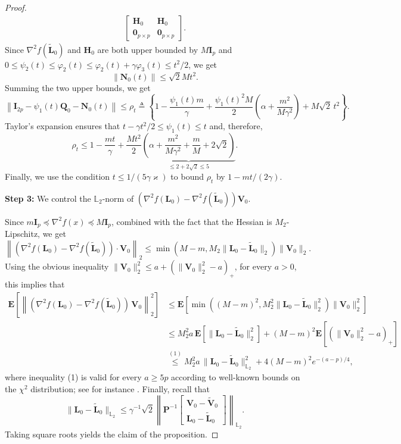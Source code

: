 \documentclass[a4paper,bej,preprint,reqno]{imsart}
\newcommand\bfE{\mathbf E}
\newcommand\bfP{\mathbf P}
\newcommand\bfQ{\mathbf Q}
\newcommand\bfN{\mathbf N}
\newcommand\bfH{\mathbf H}
\newcommand\bL{\boldsymbol L}
\newcommand\bV{\boldsymbol V}
\newcommand\LL{\mathbb L}
\newcommand\bfI{\mathbf I}
\def\Tilde{\widetilde}
\begin{document}
\begin{proof}
\begin{align}
\begin{bmatrix}
     \bfH_0 & \bfH_0 \\
      \mathbf 0_{p\times p} &  \mathbf 0_{p\times p}
\end{bmatrix}.
\end{align}
Since $\nabla^2f(\Tilde{\bL}_0)$ and $\bfH_0$ are both upper bounded by $M\bfI_p$
and $0\le \psi_2(t)\le\varphi_2(t)\le\varphi_2(t)+\gamma\varphi_3(t)\le t^2/2$, we get
$$
\left\|\bfN_0(t)\right\|\le \sqrt{2}M t^2.
$$
Summing the two upper bounds, we get
$$
\left\|\bfI_{2p}-\psi_1(t)\bfQ_0-\bfN_0(t)\right\|\le\rho_t
\triangleq\left\{1-\frac{\psi_1(t)m}{\gamma}+\frac{\psi_1(t)^2M}{2}
\left(\alpha+\frac{m^2}{M\gamma^2}\right)+
M\sqrt2\, t^2\right\}.$$
Taylor's expansion ensures that $t-\gamma t^2/2\le\psi_1(t)\le t$ and, therefore,
$$
\rho_t\le1-\frac{mt}{\gamma}+\frac{Mt^2}{2}\underbrace{\left(\alpha+\frac{m^2}{M\gamma^2}+\frac{m}{M}+2\sqrt{2}\right)}_{\le 2+2\sqrt{2}\le5}.
$$
Finally, we use the condition $t\le 1/(5\gamma\varkappa)$
to bound $\rho_t$ by $1-mt/(2\gamma)$.

\textbf{Step 3:} We control the ${\LL}_2$-norm of $(\nabla^2 f(\bL_0)-\nabla^2 f(\Tilde{\bL}_0))\bV_0$.

Since $m\bfI_p\preccurlyeq\nabla^2 f(x)\preccurlyeq M\bfI_p$, combined with the fact that the Hessian is $M_2$-Lipschitz, we get
$$
\left\|\left(\nabla^2 f(\bL_0)-\nabla^2 f(\Tilde{\bL}_0)\right)\cdot\bV_0\right\|_2\le \min\left(M-m,M_2\|\bL_0-\Tilde{\bL}_0\|_2\right)\|\bV_0\|_2.
$$
Using the obvious inequality $\|\bV_0\|_2^2\le a + (\|\bV_0\|_2^2-a)_+$, for every $a>0$, 
this implies that
\begin{align}
    \bfE\left[\left\|\left(\nabla^2 f(\bL_0)-\nabla^2 f(\Tilde{\bL}_0)\right)
		\,\bV_0\right\|_2^2\right]
				&\le \bfE\left[\min\left((M-m)^2,M_2^2\|\bL_0-\Tilde{\bL}_0\|^2_2\right)
						\|\bV_0\|_2^2\right]\\
				&\le M_2^2a\,\bfE\left[\|\bL_0-\Tilde{\bL}_0\|^2_2\right]
						+(M-m)^2\bfE\left[(\|\bV_0\|_2^2-a)_+\right]\\
				&\stackrel{(1)}{\le} M_2^2a\,\|\bL_0-\Tilde{\bL}_0\|^2_{\LL_2}
						+ 4(M-m)^2e^{-(a-p)/4}, 
\end{align}
where inequality (1) is valid for every $a\ge 5p$ according to well-known bounds
on the $\chi^2$ distribution; see for instance \citep[Lemmas 5-6]{ColDal17a}. 
Finally, recall that
$$
\|\bL_0-\Tilde{\bL}_0\|_{{\LL}_2}\le\gamma^{-1}\sqrt{2}\left\|\bfP^{-1}\begin{bmatrix}
     \bV_0-\Tilde{\bV}_0  \\
      \bL_0-\Tilde{\bL}_0
\end{bmatrix}\right\|_{{\LL}_2}.
$$
Taking square roots yields the claim of the proposition.
\end{proof}
\end{document}
